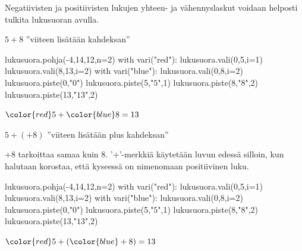     Negatiivisten ja positiivisten lukujen yhteen- ja vähennyslaskut voidaan helposti tulkita lukusuoran avulla.
    

    $5+8$ ''viiteen lisätään kahdeksan''
    
\begin{center}
\begin{kuva}
	lukusuora.pohja(-4,14,12,n=2)
	with vari("red"):
		lukusuora.vali(0,5,i=1)
		lukusuora.vali(8,13,i=2)
	with vari("blue"): lukusuora.vali(0,8,i=2)
	lukusuora.piste(0,"$0$")
	lukusuora.piste(5,"$5$",1)
	lukusuora.piste(8,"$8$",2)
	lukusuora.piste(13,"$13$",2)
\end{kuva}
       ${\color{red}5}+{\color{blue}8}=13$
\end{center}
   
    $5+(+8)$ ''viiteen lisätään plus kahdeksan''
    
    $+8$ tarkoittaa samaa kuin $8$. '$+$'-merkkiä käytetään luvun edessä silloin, kun halutaan korostaa, että kyseessä on nimenomaan positiivinen luku.
    
    
\begin{center}
\begin{kuva}
	lukusuora.pohja(-4,14,12,n=2)
	with vari("red"):
		lukusuora.vali(0,5,i=1)
		lukusuora.vali(8,13,i=2)
	with vari("blue"): lukusuora.vali(0,8,i=2)
	lukusuora.piste(0,"$0$")
	lukusuora.piste(5,"$5$",1)
	lukusuora.piste(8,"$8$",2)
	lukusuora.piste(13,"$13$",2)
\end{kuva}
       ${\color{red}5}+({\color{blue}+8})=13$
\end{center}
    
